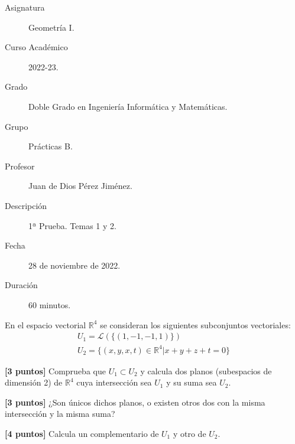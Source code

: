 \documentclass[12pt]{article}
\begin{document}

    
    

    \begin{description}
        \item[Asignatura] Geometría I.
        \item[Curso Académico] 2022-23.
        \item[Grado] Doble Grado en Ingeniería Informática y Matemáticas.
        \item[Grupo] Prácticas B.
        \item[Profesor] Juan de Dios Pérez Jiménez.
        \item[Descripción] 1ª Prueba. Temas 1 y 2.
        \item[Fecha] 28 de noviembre de 2022.
        \item[Duración] 60 minutos.
    
    \end{description}
    \newpage
    
    En el espacio vectorial $\mathbb{R}^4$ se consideran los siguientes subconjuntos vectoriales:
    \begin{gather*}
        U_1=\mathcal{L}(\{(1, -1, -1, 1)\})\\
        U_2 = \{(x, y, x, t) \in \mathbb{R}^4 | x+y+z+t=0\}
    \end{gather*}

    \begin{ejercicio}\textbf{[3 puntos]}
    Comprueba que $U_1\subset U_2$ y calcula dos planos (subespacios de dimensión 2) de $\mathbb{R}^4$ cuya intersección sea $U_1$ y su suma sea $U_2$.
    \end{ejercicio}

    \begin{ejercicio}\textbf{[3 puntos]}
    ¿Son únicos dichos planos, o existen otros dos con la misma intersección y la misma suma?
    \end{ejercicio}

    \begin{ejercicio}\textbf{[4 puntos]}
    Calcula un complementario de $U_1$ y otro de $U_2$.
    \end{ejercicio}
\end{document}
